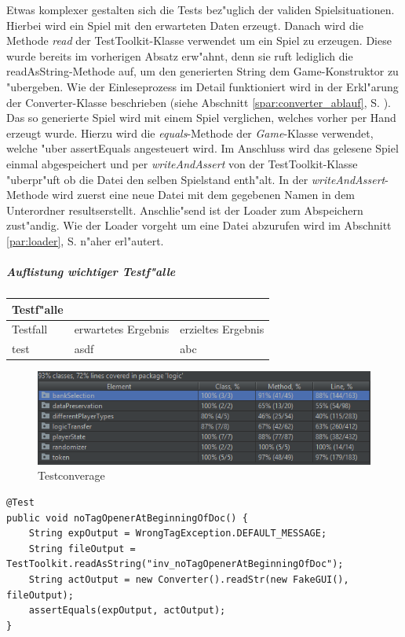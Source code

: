 Etwas komplexer gestalten sich die Tests bez"uglich der validen Spielsituationen. Hierbei wird ein Spiel mit den erwarteten Daten erzeugt. Danach wird die Methode \emph{read} der TestToolkit-Klasse verwendet um ein Spiel zu erzeugen. Diese wurde bereits im vorherigen Absatz erw"ahnt, denn sie ruft lediglich die readAsString-Methode auf, um den generierten String dem Game-Konstruktor zu "ubergeben. Wie der Einleseprozess im Detail funktioniert wird in der Erkl"arung der Converter-Klasse beschrieben (siehe Abschnitt \ref{spar:converter_ablauf}, S. \pageref{spar:converter_ablauf}). Das so generierte Spiel wird mit einem Spiel verglichen, welches vorher \glqq per Hand\grqq {} erzeugt wurde. Hierzu wird die \emph{equals}-Methode der \emph{Game}-Klasse verwendet, welche "uber assertEquals angesteuert wird. Im Anschluss wird das gelesene Spiel einmal abgespeichert und per \emph{writeAndAssert} von der TestToolkit-Klasse "uberpr"uft ob die Datei den selben Spielstand enth"alt. In der \emph{writeAndAssert}-Methode wird zuerst eine neue Datei mit dem gegebenen Namen in dem Unterordner \glqq results\grqq  erstellt. Anschlie"send ist der Loader zum Abspeichern zust"andig. Wie der Loader vorgeht um eine Datei abzurufen wird im Abschnitt \ref{par:loader}, S. \pageref{par:loader} n"aher erl"autert. 

\subparagraph{Auflistung wichtiger Testf"alle}

\begin{tabular}{lll}
\toprule
Testf"alle\\
\midrule
Testfall & erwartetes Ergebnis & erzieltes Ergebnis\\
\midrule
test & asdf & abc\\
\bottomrule
\end{tabular}
\label{tab:testfaelle}


\begin{figure}
	\centering
	\includegraphics{pics/testCoverage}
	\caption{Testconverage}
	\label{fig:testCoverage}
\end{figure}


\begin{lstlisting}[float,style=CodeHighlighting,caption=InvalidFileReadTests - test\_noTagOpenerAtBeginningOfDoc,label=lst:test_noTagOpenerAtBeginningOfDoc]
@Test
public void noTagOpenerAtBeginningOfDoc() {
    String expOutput = WrongTagException.DEFAULT_MESSAGE;
    String fileOutput = TestToolkit.readAsString("inv_noTagOpenerAtBeginningOfDoc");
    String actOutput = new Converter().readStr(new FakeGUI(), fileOutput);
    assertEquals(expOutput, actOutput);
}
\end{lstlisting}